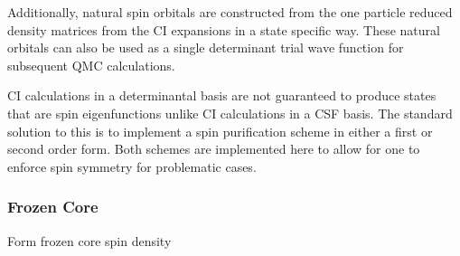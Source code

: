 Additionally, natural spin orbitals are constructed from the one particle reduced density matrices from the CI expansions in a state specific way.
These natural orbitals can also be used as a single determinant trial wave function for subsequent QMC calculations.

CI calculations in a determinantal basis are not guaranteed to produce states that are spin eigenfunctions unlike CI calculations in a CSF basis.
The standard solution to this is to implement a spin purification scheme in either a first or second order form.\citehere
Both schemes are implemented here to allow for one to enforce spin symmetry for problematic cases.

\subsubsection{Frozen Core}

Form frozen core spin density

% 
% 

